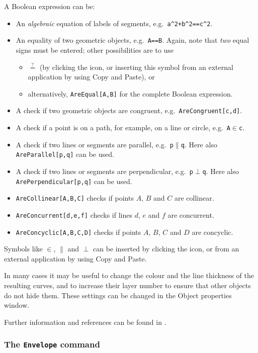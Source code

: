 \documentclass{article}
\begin{document}
A Boolean expression can be:
\begin{itemize}
\item An \textit{algebraic} equation of labels of segments, e.g.~\texttt{a\^{}2+b\^{}2==c\^{}2}.
\item An equality of two geometric objects, e.g.~\texttt{A==B}. Again, note that \textit{two} equal signs must be entered; other possibilities are to use
\begin{itemize}
    \item $\stackrel{?}{=}$ (by clicking the \framebox{$\alpha$} icon, or inserting this symbol from an external application by using Copy and Paste), or
    \item alternatively, \texttt{AreEqual[A,B]} for the complete Boolean expression.
\end{itemize}
\item A check if two geometric objects are congruent, e.g.~\texttt{AreCongruent[c,d]}.
\item A check if a point is on a path, for example, on a line or circle, e.g.~\texttt{A$\in$c}.
\item A check if two lines or segments are parallel, e.g.~\texttt{p$\parallel$q}. Here also \texttt{AreParallel[p,q]} can be used.
\item A check if two lines or segments are perpendicular, e.g.~\texttt{p$\perp$q}. Here also \texttt{ArePerpendicular[p,q]} can be used.
\item \texttt{AreCollinear[A,B,C]} checks if points $A$, $B$ and $C$ are collinear.
\item \texttt{AreConcurrent[d,e,f]} checks if lines $d$, $e$ and $f$ are concurrent.
\item \texttt{AreConcyclic[A,B,C,D]} checks if points $A$, $B$, $C$ and $D$ are concyclic.
\end{itemize}
Symbols like $\in$, $\parallel$ and $\perp$ can be inserted by clicking the \framebox{$\alpha$} icon, or from an external application by using Copy and Paste.

In many cases it may be useful to change the colour and the line thickness of the resulting curves, and to increase their layer number to ensure that other objects do not hide them. These settings can be changed in the Object properties window.

Further information and references can be found in \cite{AbanadesBotanaKovacsRecioSolyomGecse}.

\subsubsection{The \texttt{Envelope} command}
\end{document}
